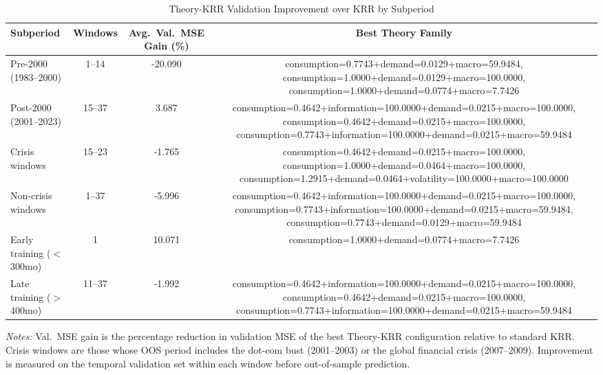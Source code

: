 \begin{table}[H]
\centering
\caption{Theory-KRR Validation Improvement over KRR by Subperiod}
\label{tab:subsample}
\small
\begin{tabular}{lccc}
\toprule
Subperiod & Windows & Avg.\ Val.\ MSE Gain (\%) & Best Theory Family \\
\midrule
Pre-2000 (1983--2000) & 1--14 & -20.090 & consumption=0.7743+demand=0.0129+macro=59.9484, consumption=1.0000+demand=0.0129+macro=100.0000, consumption=1.0000+demand=0.0774+macro=7.7426 \\
Post-2000 (2001--2023) & 15--37 & 3.687 & consumption=0.4642+information=100.0000+demand=0.0215+macro=100.0000, consumption=0.4642+demand=0.0215+macro=100.0000, consumption=0.7743+information=100.0000+demand=0.0215+macro=59.9484 \\[4pt]
Crisis windows & 15--23 & -1.765 & consumption=0.4642+demand=0.0215+macro=100.0000, consumption=1.0000+demand=0.0464+macro=100.0000, consumption=1.2915+demand=0.0464+volatility=100.0000+macro=100.0000 \\
Non-crisis windows & 1--37 & -5.996 & consumption=0.4642+information=100.0000+demand=0.0215+macro=100.0000, consumption=0.7743+information=100.0000+demand=0.0215+macro=59.9484, consumption=0.7743+demand=0.0129+macro=59.9484 \\[4pt]
Early training ($<$300mo) & 1 & 10.071 & consumption=1.0000+demand=0.0774+macro=7.7426 \\
Late training ($>$400mo) & 11--37 & -1.992 & consumption=0.4642+information=100.0000+demand=0.0215+macro=100.0000, consumption=0.4642+demand=0.0215+macro=100.0000, consumption=0.7743+information=100.0000+demand=0.0215+macro=59.9484 \\
\bottomrule
\end{tabular}
\begin{minipage}{\textwidth}
\vspace{4pt}
\footnotesize
\textit{Notes:} Val.\ MSE gain is the percentage reduction in validation MSE of the best Theory-KRR configuration relative to standard KRR. Crisis windows are those whose OOS period includes the dot-com bust (2001--2003) or the global financial crisis (2007--2009). Improvement is measured on the temporal validation set within each window before out-of-sample prediction.
\end{minipage}
\end{table}